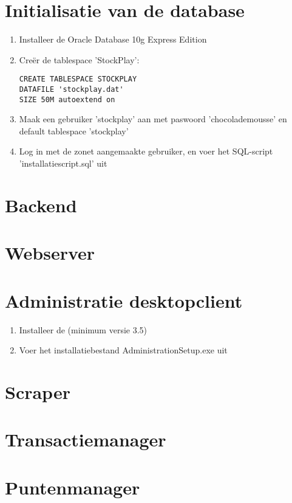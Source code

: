 \section{Initialisatie van de database}

\begin{enumerate}
\item{Installeer de Oracle Database 10g Express Edition}
\item{Cre\"er de tablespace 'StockPlay': 
\begin{verbatim}
CREATE TABLESPACE STOCKPLAY 
DATAFILE 'stockplay.dat' 
SIZE 50M autoextend on
\end{verbatim}
}
\item{Maak een gebruiker 'stockplay' aan met paswoord 'chocolademousse' en default tablespace 'stockplay'}
\item{Log in met de zonet aangemaakte gebruiker, en voer het SQL-script 'installatiescript.sql' uit}
\end{enumerate}


\section{Backend}

\section{Webserver}

\section{Administratie desktopclient}
\begin{enumerate}
\item Installeer de  (minimum versie 3.5)
\item{Voer het installatiebestand AdministrationSetup.exe uit}
\end{enumerate}

\section{Scraper}

\section{Transactiemanager}

\section{Puntenmanager}


